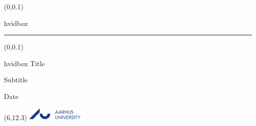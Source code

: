\documentclass[t,24pt,aspectratio=169]{beamer}
\begin{document}
{
\begin{frame}
    \begin{textblock*}{\textwidth}(0\textwidth,0.1\textheight)
        \begin{beamercolorbox}[wd=9cm,ht=7.3cm,sep=0.5cm]{hvidbox}
            \fontsize{5}{10}\selectfont
            \noindent\textcolor{AUblaa}{\rule{8.3cm}{0.4pt}}
        \end{beamercolorbox}
    \end{textblock*}
    \begin{textblock*}{\textwidth}(0\textwidth,0.1\textheight)
        \begin{beamercolorbox}[wd=9cm,sep=0.5cm]{hvidbox}
                \Huge \textcolor{AUblaa}{Title
                }
                \vspace{0.5cm}
                \par
                \Large
                Subtitle
                \vspace{0.5cm}
                \par
                \normalsize
                Date
        \end{beamercolorbox}
    \end{textblock*}
    \begin{textblock}{1}(6,12.3)
        \includegraphics[width=3cm]{AU/AU-logo.png}
    \end{textblock}
\end{frame}
}
\end{document}
